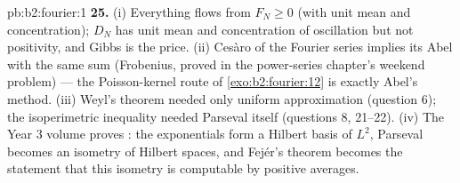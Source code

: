 \begin{solution}{pb:b2:fourier:1}
\textbf{25.} (i) Everything flows from $F_N \geq 0$ (with unit
mean and concentration); $D_N$ has unit mean and concentration
of oscillation but not positivity, and Gibbs is the price.
(ii) Ces\`aro  of the Fourier series implies its
Abel  with the same sum (Frobenius, proved in the
power-series chapter's weekend problem) --- the Poisson-kernel
route of \cref{exo:b2:fourier:12} is exactly Abel's method.
(iii) Weyl's theorem needed only uniform approximation
(question 6); the isoperimetric inequality needed Parseval
itself (questions 8, 21--22). (iv) The Year 3 volume proves
: the exponentials form a Hilbert basis of $L^2$,
Parseval becomes an isometry of Hilbert spaces, and Fej\'er's
theorem becomes the statement that this isometry is computable
by positive averages.
\end{solution}
